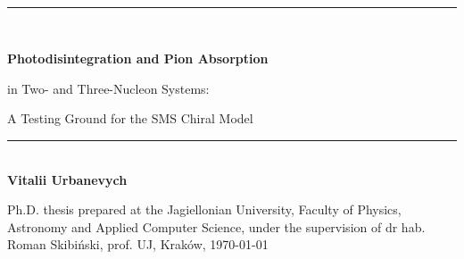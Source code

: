 \documentclass[oneside,a4paper,openright]{report}
\newcommand{\HRule}{\rule{\linewidth}{0.5mm}}
\begin{document}
\newpage

\begin{titlepage}
\begin{center}

~\\[5cm]

\HRule 
\\[0.4cm]
{
\LARGE\bfseries 
Photodisintegration and Pion Absorption

in Two- and Three-Nucleon Systems:

A Testing Ground for the SMS Chiral Model
\\[0.4cm] 
}
\HRule \\[0.4cm]

{
\LARGE
\bfseries
Vitalii Urbanevych
}
\vfill

{
\large
Ph.D. thesis prepared at the Jagiellonian University,
\newline 
Faculty of Physics, Astronomy and Applied Computer Science,
\newline 
under the supervision of dr hab. Roman Skibi\'nski, prof. UJ,
\newline 
 Krak\'ow,
}
{
\large \today
}


\end{center}
\end{titlepage}
\end{document}
